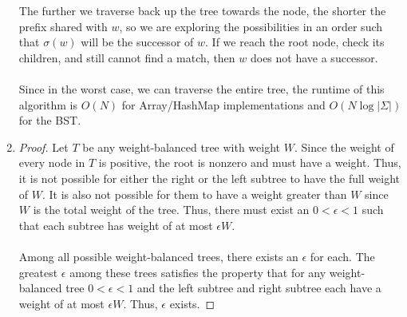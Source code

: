 \documentclass{article}
\theoremstyle{casestyle}
\begin{document}
\begin{enumerate}[i]
The further we traverse back up the tree towards the node, the shorter the prefix shared with $w$, so we are exploring the possibilities in an order such that $\sigma(w)$ will be the successor of $w$. If we reach the root node, check its children, and still cannot find a match, then $w$ does not have a successor.
\\\\
Since in the worst case, we can traverse the entire tree, the runtime of this algorithm is $O(N)$ for Array/HashMap implementations and $O(N\log{\left|\Sigma\right|})$ for the BST.

\item 
\begin{proof}{}
  Let $T$ be any weight-balanced tree with weight $W$. Since the weight of every node in $T$ is positive, the root is nonzero and must have a weight. Thus, it is not possible for either the right or the left subtree to have the full weight of $W$. It is also not possible for them to have a weight greater than $W$ since $W$ is the total weight of the tree. Thus, there must exist an $0 < \epsilon < 1$ such that each subtree has weight of at most $\epsilon W$. \\\\
  Among all possible weight-balanced trees, there exists an $\epsilon$ for each. The greatest $\epsilon$ among these trees satisfies the property that for any weight-balanced tree $0 < \epsilon < 1$ and the left subtree and right subtree each have a weight of at most $\epsilon W$. Thus, $\epsilon$ exists.
\end{proof}


\end{enumerate}
\end{document}
